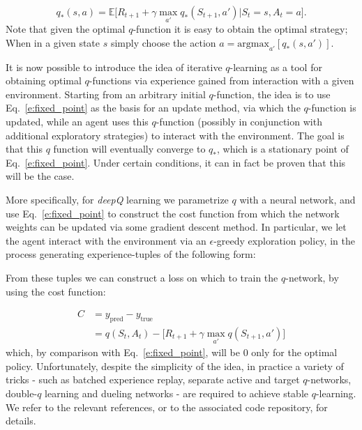 \documentclass[twocolumn,preprintnumbers,amsmath,amssymb,notitlepage,nofootinbib,longbibliography,superscriptaddress,aps,pra,10pt]{revtex4-1}
\begin{document}
	\begin{equation}\label{e:fixed_point}
		q_*(s,a) = \mathbb{E}\big[R_{t+1} + \gamma\max_{a'}q_{*}(S_{t+1},a')\big|S_t = s, A_t = a \big].
	\end{equation}
	Note that given the optimal $q$-function it is easy to obtain the optimal strategy; When in a given state $s$ simply choose the action $a = \mathrm{argmax}_{a'}[q_*(s,a')]$.

	It is now possible to introduce the idea of iterative $q$-learning as a tool for obtaining optimal $q$-functions via experience gained from interaction with a given environment.
	Starting from an arbitrary initial $q$-function, the idea is to use Eq.~\eqref{e:fixed_point} as the basis for an update method, via which the $q$-function is updated, while an agent uses this $q$-function (possibly in conjunction with additional exploratory strategies) to interact with the environment.
	The goal is that this $q$ function will eventually converge to $q_*$, which is a stationary point of Eq.~\eqref{e:fixed_point}.
	Under certain conditions, it can in fact be proven that this will be the case.

	More specifically, for \textit{deepQ} learning we parametrize $q$ with a neural network, and use Eq.~\eqref{e:fixed_point} to construct the cost function from which the network weights can be updated via some gradient descent method.
	In particular, we let the agent interact with the environment via an $\epsilon$-greedy exploration policy, in the process generating experience-tuples of the following form:

	\begin{equation}
		[S_t,A_t,R_{t+1},S_{t+1}]
	\end{equation}
	From these tuples we can construct a loss on which to train the $q$-network, by using the cost function:

	\begin{align} 
		C &= y_{\mathrm{pred}} - y_{\mathrm{true}}\\
		&= q(S_t,A_t) - \big[R_{t+1} + \gamma\max_{a'}q(S_{t+1},a') \big]
	\end{align}
	which, by comparison with Eq.~\eqref{e:fixed_point}, will be 0 only for the optimal policy.
	Unfortunately, despite the simplicity of the idea, in practice a variety of tricks - such as batched experience replay, separate active and target $q$-networks, double-$q$ learning and dueling networks - are required to achieve stable $q$-learning.
	We refer to the relevant references, or to the associated code repository, for details.
\end{document}

